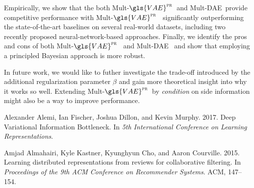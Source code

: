 \documentclass[sigconf]{acmart}
\newcommand{\mvae}{{\small Mult-}$\gls{VAE}^{\text{\sc pr}}$}
\newcommand{\mdae}{{\small Mult-}\gls{DAE}}
\begin{document}
Empirically, we show that the both \mvae~and \mdae~provide competitive performance with \mvae~ significantly outperforming the state-of-the-art baselines on several real-world datasets, including two recently proposed neural-network-based approaches. Finally, we identify the pros and cons of both \mvae~ and \mdae~ and show that employing a principled Bayesian approach is more robust.

In future work, we would like to futher investigate the trade-off introduced by the additional regularization parameter $\beta$ and gain more theoretical insight into why it works so well. 
Extending \mvae~by \emph{condition} on side information might also be a way to improve performance. 
 


\begin{thebibliography}{54}


\ifx \showCODEN    \undefined {}     \fi
\ifx \showDOI      \undefined \def \showDOI       #1{#1}\fi
\ifx \showISBNx    \undefined \def \showISBNx     #1{\unskip}     \fi
\ifx \showISBNxiii \undefined \def \showISBNxiii  #1{\unskip}     \fi
\ifx \showISSN     \undefined \def \showISSN      #1{\unskip}     \fi
\ifx \showLCCN     \undefined \def \showLCCN      #1{\unskip}     \fi
\ifx \shownote     \undefined \def \shownote      #1{#1}          \fi
\ifx \showarticletitle \undefined \def \showarticletitle #1{#1}   \fi
\ifx \showURL      \undefined \def \showURL       {\relax}        \fi
\providecommand\bibfield[2]{#2}
\providecommand\bibinfo[2]{#2}
\providecommand\natexlab[1]{#1}
\providecommand\showeprint[2][]{arXiv:#2}

\bibfield{author}{\bibinfo{person}{Alexander Alemi}, \bibinfo{person}{Ian
  Fischer}, \bibinfo{person}{Joshua Dillon}, {and} \bibinfo{person}{Kevin
  Murphy}.} \bibinfo{year}{2017}\natexlab{}.
\newblock \showarticletitle{Deep Variational Information Bottleneck}. In
  \bibinfo{booktitle}{\emph{5th International Conference on Learning
  Representations}}.
\newblock


\bibfield{author}{\bibinfo{person}{Amjad Almahairi}, \bibinfo{person}{Kyle
  Kastner}, \bibinfo{person}{Kyunghyun Cho}, {and} \bibinfo{person}{Aaron
  Courville}.} \bibinfo{year}{2015}\natexlab{}.
\newblock \showarticletitle{Learning distributed representations from reviews
  for collaborative filtering}. In \bibinfo{booktitle}{\emph{Proceedings of the
  9th ACM Conference on Recommender Systems}}. ACM, \bibinfo{pages}{147--154}.
\newblock



\end{thebibliography}
\end{document}
